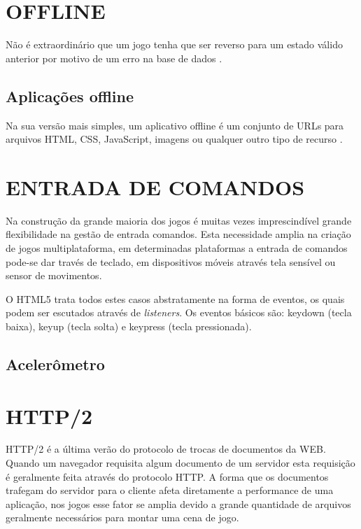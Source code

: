 \section{OFFLINE}
\begin{draft}
Não é extraordinário que um jogo tenha que ser reverso para um estado
válido anterior por motivo de um erro na base de dados \autocite[pp.
5]{browserGamesTechnologyAndFuture}.

\subsection{Aplicações offline}
Na sua versão mais simples, um aplicativo offline é um conjunto de
URLs para arquivos HTML, CSS, JavaScript, imagens ou qualquer outro tipo
de recurso \autocite{diveIntohtml}.

\end{draft}
\section{ENTRADA DE COMANDOS}

Na construção da grande maioria dos jogos é muitas vezes
imprescindível grande flexibilidade na gestão de entrada comandos.
Esta necessidade amplia na criação de jogos multiplataforma, em
determinadas plataformas a entrada de comandos pode-se dar través de
teclado, em dispositivos móveis através tela sensível ou sensor de
movimentos.

O HTML5 trata todos estes casos abstratamente na forma de eventos, os
quais podem ser escutados através de \textit{listeners}. Os eventos
básicos são: keydown (tecla baixa), keyup (tecla solta) e keypress
(tecla pressionada).

\subsection{Acelerômetro}
\begin{draft}
\end{draft}
\section{HTTP/2}
HTTP/2 é a última verão do protocolo de trocas de documentos da
WEB. Quando um navegador requisita algum documento de um servidor esta
requisição é geralmente feita através do protocolo HTTP. A forma
que os documentos trafegam do servidor para o cliente afeta diretamente
a performance de uma aplicação, nos jogos esse fator se amplia devido
a grande quantidade de arquivos geralmente necessários para montar uma
cena de jogo.

